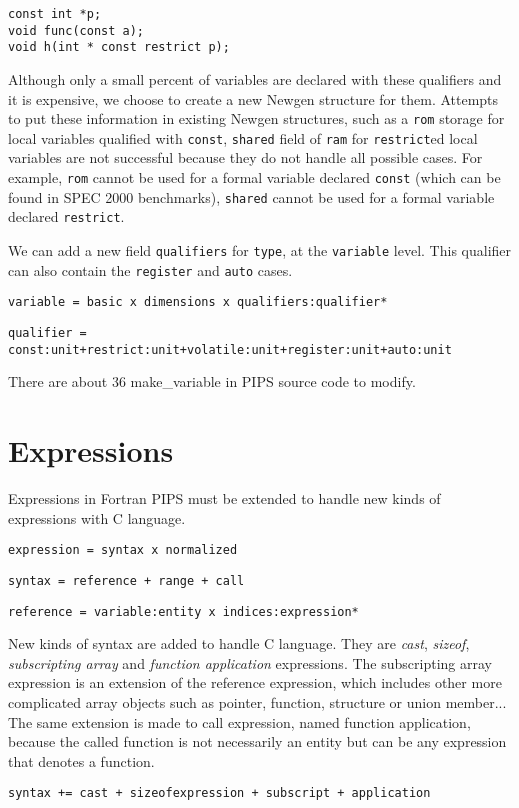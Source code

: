 \documentclass[a4paper]{report}
\begin{document}
\begin{lstlisting}
const int *p;
void func(const a);
void h(int * const restrict p);
\end{lstlisting}
Although only a small percent of variables are declared with these
qualifiers and it is expensive, we choose to create a new Newgen structure for them. Attempts
to put these information in existing Newgen
structures, such as a \verb/rom/
storage for local variables qualified with \verb/const/, \verb/shared/
field of \verb/ram/ for \verb/restrict/ed local variables are not
successful because they do not handle all possible
cases. For example, \verb/rom/ cannot be used for a formal variable declared \verb/const/ (which
can be found in SPEC 2000 benchmarks),  \verb/shared/ cannot be used for a
formal variable declared \verb/restrict/.  

We can add a new field \verb/qualifiers/ for \verb/type/, at the
\verb/variable/ level. This qualifier can also contain the \verb/register/
and \verb/auto/ cases.

\verb/variable = basic x dimensions x qualifiers:qualifier*/

\verb/qualifier = const:unit+restrict:unit+volatile:unit+register:unit+auto:unit/

There are about 36 make\_variable in PIPS source code to modify.


\chapter{Expressions}

Expressions in Fortran PIPS must be extended to handle new kinds of
expressions with C language.

\verb/expression = syntax x normalized/

\verb/syntax = reference + range + call/

\verb/reference = variable:entity x indices:expression*/

New kinds of syntax are added to handle C language. They are {\it cast},
 {\it sizeof}, {\it subscripting array} and
{\it function application} expressions. The subscripting array expression
is an extension of the reference expression, which includes other
more complicated array objects such as pointer, function, 
structure or union member... The same extension is made to call
expression, named function application, because the called function is
not necessarily an entity but can be any expression that denotes a function.   

\verb/syntax += cast + sizeofexpression + subscript + application/
\end{document}

